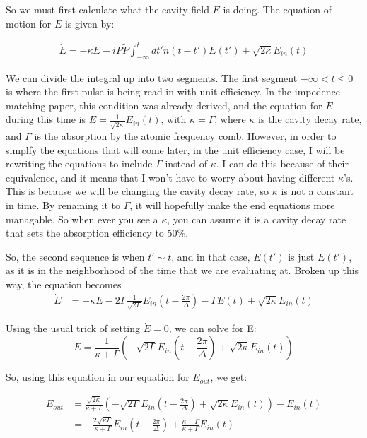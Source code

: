 \documentclass[12pt]{article}
\begin{document}
So we must first calculate what the cavity field $E$ is doing. The equation of motion for $E$ is given by:

\begin{align}
\dot{E} = -\kappa E -iP\tilde{P}\int_{-\infty}^t dt'\tilde{n}(t-t')E(t')+\sqrt{2\kappa} E_{in}(t)
\end{align}

We can divide the integral up into two segments. The first segment $-\infty<t\le0$ is where the first pulse is being read in with unit efficiency. In the impedence matching paper, this condition was already derived, and the equation for $E$ during this time is $E = \frac{1}{\sqrt{2\kappa}}E_{in}(t)$, with $\kappa = \Gamma$, where $\kappa$ is the cavity decay rate, and $\Gamma$ is the absorption by the atomic frequency comb. However, in order to simplfy the equations that will come later, in the unit efficiency case, I will be rewriting the equations to include $\Gamma$ instead of $\kappa$. I can do this
because of their equivalence, and it means that I won't have to worry about having different $\kappa$'s. This is because we will be changing the cavity decay rate, so $\kappa$ is not a constant in time. By renaming it to $\Gamma$, it will hopefully make the end equations more managable. So when ever you see a $\kappa$, you can assume it is a cavity decay rate that sets the absorption efficiency to 50\%.

So, the second sequence is when $t'\sim t$, and in that case, $E(t')$ is just $E(t')$, as it is in the neighborhood of the time
that we are evaluating at. Broken up this way, the equation becomes
\begin{align}
\dot{E} & = -\kappa E -2\Gamma \frac{1}{\sqrt{2\Gamma}}E_{in}(t-\frac{2 \pi}{\Delta}) -\Gamma E(t) +\sqrt{2 \kappa} E_{in}(t)
\end{align}

Using the usual trick of setting $\dot{E}=0$, we can solve for E:
\begin{equation}
E = \frac{1}{\kappa +\Gamma} \left(- \sqrt{2 \Gamma} E_{in}(t-\frac{2 \pi}{\Delta}) +\sqrt{2 \kappa}E_{in}(t)\right)
\end{equation}

So, using this equation in our equation for $E_{out}$, we get:

\begin{align}
\label{eoutp20}
E_{out} &= \frac{\sqrt{2\kappa}}{\kappa+\Gamma} \left(-\sqrt{2 \Gamma} E_{in}(t- \frac{2 \pi}{\Delta}) +\sqrt{2\kappa} E_{in}(t)\right) - E_{in}(t)\\
&= -\frac{2 \sqrt{\kappa \Gamma}}{\kappa + \Gamma}E_{in}(t- \frac{2\pi}{\Delta}) +\frac{\kappa - \Gamma}{\kappa+\Gamma} E_{in}(t)
\end{align}
\end{document}

